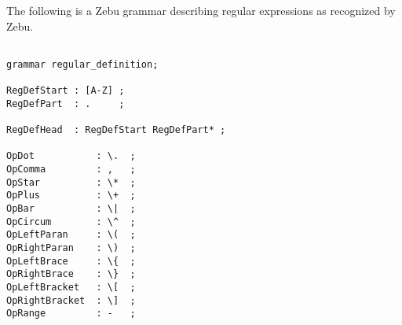 \documentclass[12pt]{article}
\begin{document}
The following is a Zebu grammar describing regular expressions as recognized by Zebu.

\begin{verbatim}

grammar regular_definition;

RegDefStart : [A-Z] ;
RegDefPart  : .     ;

RegDefHead  : RegDefStart RegDefPart* ;

OpDot           : \.  ;
OpComma         : ,   ;
OpStar          : \*  ;
OpPlus          : \+  ;
OpBar           : \|  ;
OpCircum        : \^  ;
OpLeftParan     : \(  ;
OpRightParan    : \)  ;
OpLeftBrace     : \{  ;
OpRightBrace    : \}  ;
OpLeftBracket   : \[  ;
OpRightBracket  : \]  ;
OpRange         : -   ;

\end{verbatim}
\end{document}
